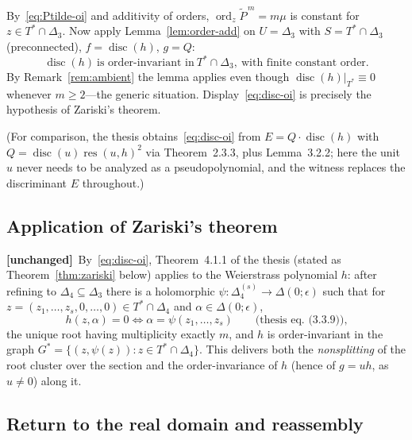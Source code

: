 \documentclass[11pt,a4paper]{article}
\theoremstyle{plain}
\theoremstyle{definition}
\DeclareMathOperator{\ord}{ord}
\DeclareMathOperator{\res}{res}
\DeclareMathOperator{\disc}{disc}
\newcommand{\UNCHANGED}{\textbf{[unchanged]}}
\begin{document}
By~\eqref{eq:Ptilde-oi} and additivity of orders,
$\ord_z\widetilde P^{\,m}=m\mu$ is constant for $z\in T^*\cap\Delta_3$. Now
apply Lemma~\ref{lem:order-add} on $U=\Delta_3$ with $S=T^*\cap\Delta_3$
(preconnected), $f=\disc(h)$, $g=Q$:
\begin{equation}\label{eq:disc-oi}
  \disc(h)\ \text{is order-invariant in}\ T^*\cap\Delta_3,
  \ \text{with finite constant order} .
\end{equation}
By Remark~\ref{rem:ambient} the lemma applies even though
$\disc(h)|_{T^*}\equiv 0$ whenever $m\ge2$---the generic situation.
Display~\eqref{eq:disc-oi} is precisely the hypothesis of Zariski's theorem.

(For comparison, the thesis obtains~\eqref{eq:disc-oi} from
$E=Q\cdot\disc(h)$ with $Q=\disc(u)\res(u,h)^2$ via Theorem~2.3.3, plus
Lemma~3.2.2; here the unit $u$ never needs to be analyzed as a
pseudopolynomial, and the witness replaces the discriminant $E$ throughout.)

\subsection{Application of Zariski's theorem}\label{ssec:zariski-apply}

\UNCHANGED\ By~\eqref{eq:disc-oi}, Theorem~4.1.1 of the thesis (stated as
Theorem~\ref{thm:zariski} below) applies to the Weierstrass polynomial $h$:
after refining to $\Delta_4\subseteq\Delta_3$ there is a holomorphic
$\psi:\Delta_4^{(s)}\to\Delta(0;\epsilon)$ such that for
$z=(z_1,\dots,z_s,0,\dots,0)\in T^*\cap\Delta_4$ and
$\alpha\in\Delta(0;\epsilon)$,
\[
  h(z,\alpha)=0\iff\alpha=\psi(z_1,\dots,z_s)
  \qquad\text{(thesis eq.~(3.3.9)),}
\]
the unique root having multiplicity exactly $m$, and $h$ is order-invariant in
the graph $G^*=\{(z,\psi(z)):z\in T^*\cap\Delta_4\}$. This delivers both the
\emph{nonsplitting} of the root cluster over the section and the
order-invariance of $h$ (hence of $g=uh$, as $u\neq0$) along it.

\subsection{Return to the real domain and reassembly}\label{ssec:real}
\end{document}
